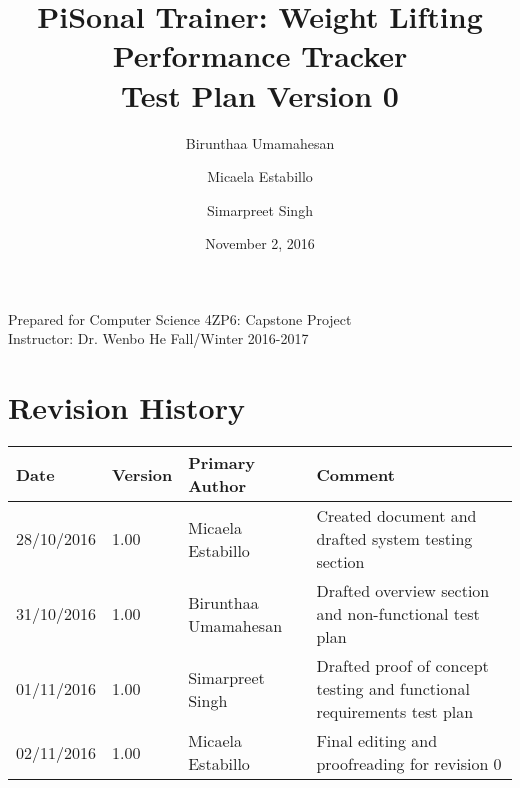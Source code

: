 \documentclass{article}
\title{
PiSonal Trainer: Weight Lifting Performance Tracker\\
\Large {Test Plan Version 0}
}
\date{November 2, 2016}
\author{Birunthaa Umamahesan \and Micaela Estabillo \and Simarpreet Singh}
\begin{document}
\maketitle
\thispagestyle{empty}
\vfill
\begin{center}
    Prepared for Computer Science 4ZP6: Capstone Project \\
    Instructor: Dr. Wenbo He
    Fall/Winter 2016-2017\\
\end{center}
\newpage

\tableofcontents

\listoftables


\section*{Revision History}
\begingroup
\begin{tabular}{ | p{2cm} | p{1.5cm} | p{3.8cm} | p{7cm} |} 
    \hline
    \textbf{Date} & \textbf{Version} & \textbf{Primary Author} & \textbf{Comment}\\
    \hline
    28/10/2016 & 1.00 & Micaela Estabillo & Created document and drafted system testing section\\ 
    \hline
    31/10/2016 & 1.00 & Birunthaa Umamahesan & Drafted overview section and non-functional test plan\\
    \hline
    01/11/2016 & 1.00 & Simarpreet Singh & Drafted proof of concept testing and functional requirements test plan \\
    \hline
    02/11/2016 & 1.00 & Micaela Estabillo & Final editing and proofreading for revision 0\\
    \hline
\end{tabular}
\endgroup

\newpage

\end{document}
